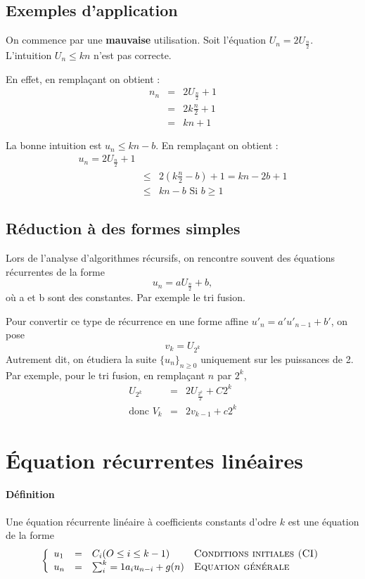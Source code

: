 	\subsection{Exemples d'application}
	On commence par une \textbf{mauvaise} utilisation. Soit l'équation $U_n = 2 U_{\frac{n}{2}}$. L'intuition $U_n \leq kn$ n'est pas correcte.

	En effet, en remplaçant on obtient : 
	\begin{eqnarray*}
		n_n &=& 2U_{\frac{n}{2}}+1\\
		&=& 2k \frac{n}{2} + 1\\
		&=& kn + 1
	\end{eqnarray*}
	
	La bonne intuition est $u_n \leq kn - b$. En remplaçant on obtient : 
	\begin{eqnarray*}
		u_n = 2U_{\frac{n}{2}} + 1\\
		&\leq& 2(k\frac{n}{2} - b) + 1= kn - 2b + 1\\
		&\leq& kn -b\textrm{ Si } b \geq 1
	\end{eqnarray*}

	\subsection{Réduction à des formes simples}
	Lors de l'analyse d'algorithmes récursifs, on rencontre souvent des équations récurrentes de la forme $$u_n = aU_{\frac{n}{2}}+b,$$ où a et b sont des
	constantes. Par exemple le tri fusion.

	Pour convertir ce type de récurrence en une forme affine $u'_n = a'u'_{n-1}+b'$, on pose
	$$v_k = U_{2^k}$$
	Autrement dit, on étudiera la suite $\{u_n\}_{n \geq 0}$ uniquement sur les puissances de 2.
	\\
	Par exemple, pour le tri fusion, en remplaçant $n$ par $2^k$, 
	\begin{eqnarray*}
		U_{2^k} &=& 2U_{\frac{2^k}{2}} + C2^k\\
		\textrm{donc }V_k &=& 2v_{k-1} + c2^k
	\end{eqnarray*}

	\section{Équation récurrentes linéaires}
	\paragraph{Définition} Une équation récurrente linéaire à coefficients constants d'odre $k$ est une équation de la forme 
	\begin{displaymath}
		\left\{ \begin{array}{llll}
			u_1 &=& C_i (O \leq i \leq k-1) & \textsc{Conditions initiales (CI)}\\
			u_n &=&  \sum^k_i=1 a_i u_{n-i} + g(n) & \textsc{Equation générale}
		\end{array} \right.
	\end{displaymath}

